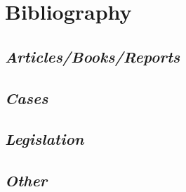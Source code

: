 \newpage
\section{Bibliography}

\subsection{\textit{Articles/Books/Reports}}

\subsection{\textit{Cases}}

\subsection{\textit{Legislation}}

\subsection{\textit{Other}}

